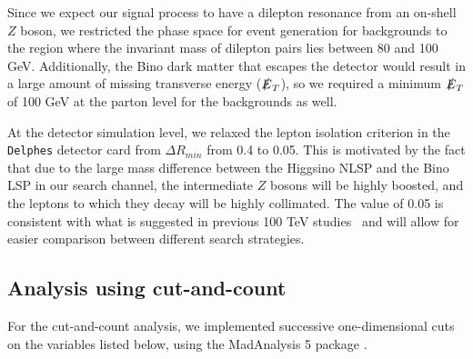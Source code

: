 \documentclass[a4paper,11pt]{article}
\newcommand{\met}{{\slashed{E}_T}}
\begin{document}
Since we expect our signal process to have a dilepton resonance from an on-shell
$Z$ boson, we restricted the phase space for event generation for backgrounds to
the region where the invariant mass of dilepton pairs lies between 80 and 100
GeV. Additionally, the Bino dark matter that escapes the detector would result
in a large amount of missing transverse energy ($\met$), so we required
a minimum $\met$ of 100 GeV at the parton level for the backgrounds as
well.  

At the detector simulation level, we relaxed the lepton isolation criterion in the
\texttt{Delphes} detector card from $\Delta R_{min}$ from 0.4 to 0.05. This is
motivated by the fact that due to the large mass difference between the Higgsino
NLSP and the Bino LSP in our search channel, the intermediate $Z$ bosons will be
highly boosted, and the leptons to which they decay will be highly collimated.
The value of 0.05 is consistent with what is suggested in previous 100 TeV
studies~\cite{Acharya:2014pua,Gori:2014oua,Bramante:2014tba} and will allow
for easier comparison between different search strategies.   


\subsection{Analysis using cut-and-count}
\label{event-selection}

For the cut-and-count analysis, we implemented successive one-dimensional cuts
on the variables listed below, using the MadAnalysis 5 package
\cite{Conte:2012fm}.
\end{document}
